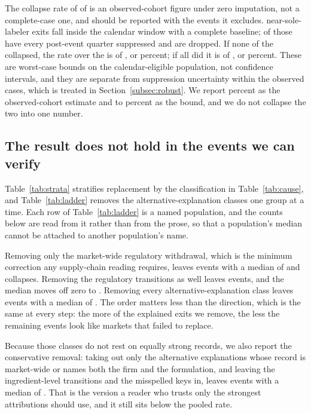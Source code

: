 \documentclass[pdflatex,sn-vancouver-num,Numbered]{sn-jnl}
\begin{document}
The collapse rate of \nBoundColl of \nBoundObs is an observed-cohort figure under zero
imputation, not a complete-case one, and should be reported
with the events it excludes. \nBoundEligUC near-sole-labeler exits fall inside the calendar window with
a complete baseline; \nBoundDroppedW of those have every post-event quarter suppressed and are
dropped. If none of the \nBoundDroppedW collapsed, the rate over the \nBoundEligW is \nBoundColl
of \nBoundElig, or \nBoundLow percent; if all \nBoundDroppedW did it is \nBoundCollHigh of
\nBoundElig, or \nBoundHigh percent. These are worst-case bounds on the calendar-eligible population, not confidence
intervals, and they are separate from suppression uncertainty within the \nBoundObs observed
cases, which is treated in Section~\ref{subsec:robust}. We report \nTreatedRate percent as the
observed-cohort estimate and \nBoundLow to \nBoundHigh percent as the bound, and we do not collapse the two
into one number.

\subsection{The result does not hold in the events we can verify}\label{subsec:strata}

Table~\ref{tab:strata} stratifies replacement by the classification in
Table~\ref{tab:cause}, and Table~\ref{tab:ladder} removes the alternative-explanation classes
one group at a time. Each row of Table~\ref{tab:ladder} is a named population, and the counts
below are read from it rather than from the prose, so that a population's median cannot be
attached to another population's name.

Removing only the market-wide regulatory withdrawal, which is the minimum correction any
supply-chain reading requires, leaves \nLadExWithdrawalNW events with a median of
\nLadExWithdrawalMed and \nLadExWithdrawalColl collapses. Removing the
\nCauseTransitionW regulatory transitions as well leaves \nLadExWithdrawalTransitionNW events,
and the median moves off zero to \nLadExWithdrawalTransitionMed. Removing every
alternative-explanation class leaves \nLadExAllExplainedNW events with a median of
\nLadExAllExplainedMed. The order matters less than the direction, which is the same at every
step: the more of the explained exits we remove, the less the remaining events look like
markets that failed to replace.

Because those classes do not rest on equally strong records, we also report the conservative
removal: taking out only the alternative explanations whose record is market-wide or names both
the firm and the formulation, and leaving the ingredient-level transitions and the misspelled
keys in, leaves \nLadExStrongEvidenceNW events with a median of \nLadExStrongEvidenceMed. That
is the version a reader who trusts only the strongest attributions should use, and it still
sits below the pooled rate.
\end{document}
